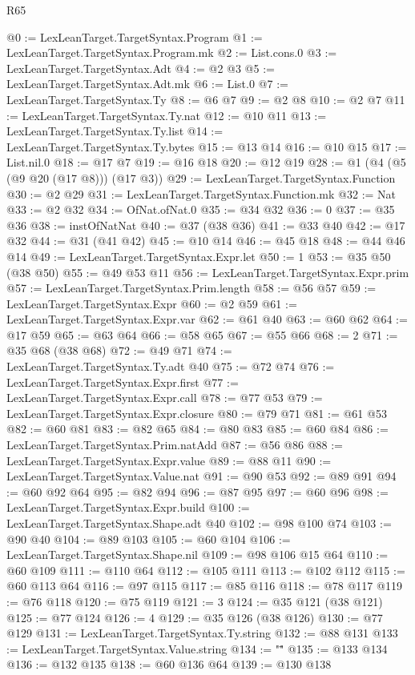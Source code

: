 \begin{lexlean}{R65}
\begin{coremodule}
@0 := LexLeanTarget.TargetSyntax.Program
@1 := LexLeanTarget.TargetSyntax.Program.mk
@2 := List.cons.{0}
@3 := LexLeanTarget.TargetSyntax.Adt
@4 := @2 @3
@5 := LexLeanTarget.TargetSyntax.Adt.mk
@6 := List.{0}
@7 := LexLeanTarget.TargetSyntax.Ty
@8 := @6 @7
@9 := @2 @8
@10 := @2 @7
@11 := LexLeanTarget.TargetSyntax.Ty.nat
@12 := @10 @11
@13 := LexLeanTarget.TargetSyntax.Ty.list
@14 := LexLeanTarget.TargetSyntax.Ty.bytes
@15 := @13 @14
@16 := @10 @15
@17 := List.nil.{0}
@18 := @17 @7
@19 := @16 @18
@20 := @12 @19
@28 := @1 (@4 (@5 (@9 @20 (@17 @8))) (@17 @3))
@29 := LexLeanTarget.TargetSyntax.Function
@30 := @2 @29
@31 := LexLeanTarget.TargetSyntax.Function.mk
@32 := Nat
@33 := @2 @32
@34 := OfNat.ofNat.{0}
@35 := @34 @32
@36 := 0
@37 := @35 @36
@38 := instOfNatNat
@40 := @37 (@38 @36)
@41 := @33 @40
@42 := @17 @32
@44 := @31 (@41 @42)
@45 := @10 @14
@46 := @45 @18
@48 := @44 @46 @14
@49 := LexLeanTarget.TargetSyntax.Expr.let
@50 := 1
@53 := @35 @50 (@38 @50)
@55 := @49 @53 @11
@56 := LexLeanTarget.TargetSyntax.Expr.prim
@57 := LexLeanTarget.TargetSyntax.Prim.length
@58 := @56 @57
@59 := LexLeanTarget.TargetSyntax.Expr
@60 := @2 @59
@61 := LexLeanTarget.TargetSyntax.Expr.var
@62 := @61 @40
@63 := @60 @62
@64 := @17 @59
@65 := @63 @64
@66 := @58 @65
@67 := @55 @66
@68 := 2
@71 := @35 @68 (@38 @68)
@72 := @49 @71
@74 := LexLeanTarget.TargetSyntax.Ty.adt @40
@75 := @72 @74
@76 := LexLeanTarget.TargetSyntax.Expr.first
@77 := LexLeanTarget.TargetSyntax.Expr.call
@78 := @77 @53
@79 := LexLeanTarget.TargetSyntax.Expr.closure
@80 := @79 @71
@81 := @61 @53
@82 := @60 @81
@83 := @82 @65
@84 := @80 @83
@85 := @60 @84
@86 := LexLeanTarget.TargetSyntax.Prim.natAdd
@87 := @56 @86
@88 := LexLeanTarget.TargetSyntax.Expr.value
@89 := @88 @11
@90 := LexLeanTarget.TargetSyntax.Value.nat
@91 := @90 @53
@92 := @89 @91
@94 := @60 @92 @64
@95 := @82 @94
@96 := @87 @95
@97 := @60 @96
@98 := LexLeanTarget.TargetSyntax.Expr.build
@100 := LexLeanTarget.TargetSyntax.Shape.adt @40
@102 := @98 @100 @74
@103 := @90 @40
@104 := @89 @103
@105 := @60 @104
@106 := LexLeanTarget.TargetSyntax.Shape.nil
@109 := @98 @106 @15 @64
@110 := @60 @109
@111 := @110 @64
@112 := @105 @111
@113 := @102 @112
@115 := @60 @113 @64
@116 := @97 @115
@117 := @85 @116
@118 := @78 @117
@119 := @76 @118
@120 := @75 @119
@121 := 3
@124 := @35 @121 (@38 @121)
@125 := @77 @124
@126 := 4
@129 := @35 @126 (@38 @126)
@130 := @77 @129
@131 := LexLeanTarget.TargetSyntax.Ty.string
@132 := @88 @131
@133 := LexLeanTarget.TargetSyntax.Value.string
@134 := "\""
@135 := @133 @134
@136 := @132 @135
@138 := @60 @136 @64
@139 := @130 @138

\end{coremodule}
\end{lexlean}
